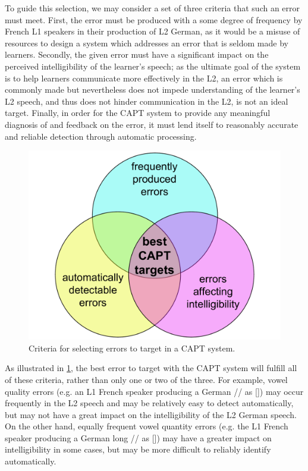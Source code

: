 	To guide this selection, we may consider %
a set of three criteria that such an error must meet. First, the error must be produced with a some degree of frequency by French L1 speakers in their production of L2 German, as it would be a misuse of resources to design a system which addresses an error that is seldom made by learners. Secondly, the given error must have a significant impact on the perceived intelligibility of the learner's speech; as the ultimate goal of the system is to help learners communicate more effectively in the L2, an error which is commonly made but nevertheless does not impede understanding of the learner's L2 speech, and thus does not hinder communication in the L2, is not an ideal target. Finally, in order for the CAPT system to provide any meaningful diagnosis of and feedback on the error, it must lend itself to reasonably accurate and reliable  detection through automatic processing. 
	
		\begin{figure}[htb]
			\centering
			\includegraphics[width=.7\textwidth]{../img/error-venn}
			\caption{Criteria for selecting errors to target in a CAPT system.}
			\label{fig:errors}
		\end{figure}
	
	 As illustrated in \ref{fig:errors}, the best error to target with the CAPT system will fulfill all of these criteria, rather than only one or two of the three. 
	 For example, vowel quality errors (e.g. an L1 French speaker producing a German // as [\textipa{\oe}]) may occur frequently in the L2 speech and may be relatively easy to detect automatically, but may not have a great impact on the intelligibility of the L2 German speech. On the other hand, equally frequent vowel quantity errors (e.g. the L1 French speaker producing a German long // as []) may have a greater impact on intelligibility in some cases, but may be more difficult to reliably identify automatically.
	

